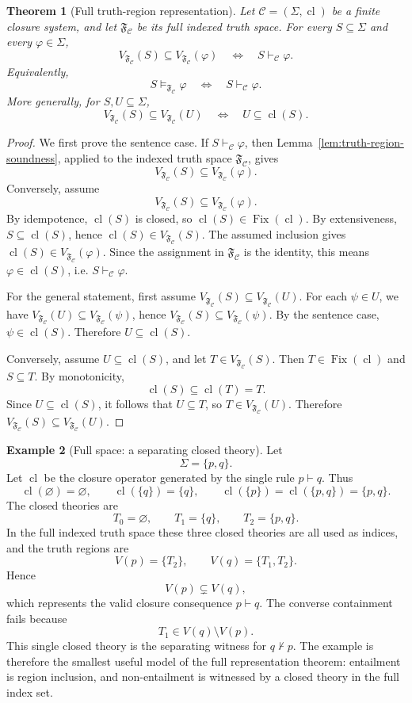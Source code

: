 \documentclass[11pt]{amsart}
\numberwithin{equation}{section}
\theoremstyle{plain}
\newtheorem{theorem}{Theorem}[section]
\theoremstyle{definition}
\newtheorem{example}[theorem]{Example}
\theoremstyle{remark}
\newcommand{\Cl}{\operatorname{cl}}
\newcommand{\Fix}{\operatorname{Fix}}
\newcommand{\C}{\mathcal C}
\newcommand{\F}{\mathfrak F}
\newcommand{\Sig}{\Sigma}
\begin{document}
\begin{theorem}[Full truth-region representation]
\label{thm:full-truth-region-representation}
Let \(\C=(\Sig,\Cl)\) be a finite closure system, and let \(\F_{\C}\) be its full indexed truth space. For every \(S\subseteq\Sig\) and every \(\varphi\in\Sig\),
\[
  V_{\F_{\C}}(S)\subseteq V_{\F_{\C}}(\varphi)
  \quad\Longleftrightarrow\quad
  S\vdash_{\C}\varphi.
\]
Equivalently,
\[
  S\models_{\F_{\C}}\varphi
  \quad\Longleftrightarrow\quad
  S\vdash_{\C}\varphi.
\]
More generally, for \(S,U\subseteq\Sig\),
\[
  V_{\F_{\C}}(S)\subseteq V_{\F_{\C}}(U)
  \quad\Longleftrightarrow\quad
  U\subseteq\Cl(S).
\]
\end{theorem}

\begin{proof}
We first prove the sentence case. If \(S\vdash_{\C}\varphi\), then Lemma~\ref{lem:truth-region-soundness}, applied to the indexed truth space \(\F_{\C}\), gives
\[
  V_{\F_{\C}}(S)\subseteq V_{\F_{\C}}(\varphi).
\]
Conversely, assume
\[
  V_{\F_{\C}}(S)\subseteq V_{\F_{\C}}(\varphi).
\]
By idempotence, \(\Cl(S)\) is closed, so \(\Cl(S)\in\Fix(\Cl)\). By extensiveness, \(S\subseteq\Cl(S)\), hence \(\Cl(S)\in V_{\F_{\C}}(S)\). The assumed inclusion gives \(\Cl(S)\in V_{\F_{\C}}(\varphi)\). Since the assignment in \(\F_{\C}\) is the identity, this means \(\varphi\in\Cl(S)\), i.e. \(S\vdash_{\C}\varphi\).

For the general statement, first assume \(V_{\F_{\C}}(S)\subseteq V_{\F_{\C}}(U)\). For each \(\psi\in U\), we have \(V_{\F_{\C}}(U)\subseteq V_{\F_{\C}}(\psi)\), hence \(V_{\F_{\C}}(S)\subseteq V_{\F_{\C}}(\psi)\). By the sentence case, \(\psi\in\Cl(S)\). Therefore \(U\subseteq\Cl(S)\).

Conversely, assume \(U\subseteq\Cl(S)\), and let \(T\in V_{\F_{\C}}(S)\). Then \(T\in\Fix(\Cl)\) and \(S\subseteq T\). By monotonicity,
\[
  \Cl(S)\subseteq\Cl(T)=T.
\]
Since \(U\subseteq\Cl(S)\), it follows that \(U\subseteq T\), so \(T\in V_{\F_{\C}}(U)\). Therefore \(V_{\F_{\C}}(S)\subseteq V_{\F_{\C}}(U)\).
\end{proof}

\begin{example}[Full space: a separating closed theory]
\label{ex:p-implies-q-full}
Let
\[
  \Sig=\{p,q\}.
\]
Let \(\Cl\) be the closure operator generated by the single rule \(p\vdash q\). Thus
\[
  \Cl(\varnothing)=\varnothing,
  \qquad
  \Cl(\{q\})=\{q\},
  \qquad
  \Cl(\{p\})=\Cl(\{p,q\})=\{p,q\}.
\]
The closed theories are
\[
  T_0=\varnothing,
  \qquad
  T_1=\{q\},
  \qquad
  T_2=\{p,q\}.
\]
In the full indexed truth space these three closed theories are all used as indices, and the truth regions are
\[
  V(p)=\{T_2\},
  \qquad
  V(q)=\{T_1,T_2\}.
\]
Hence
\[
  V(p)\subsetneq V(q),
\]
which represents the valid closure consequence \(p\vdash q\). The converse containment fails because
\[
  T_1\in V(q)\setminus V(p).
\]
This single closed theory is the separating witness for \(q\nvdash p\). The example is therefore the smallest useful model of the full representation theorem: entailment is region inclusion, and non-entailment is witnessed by a closed theory in the full index set.
\end{example}
\end{document}

